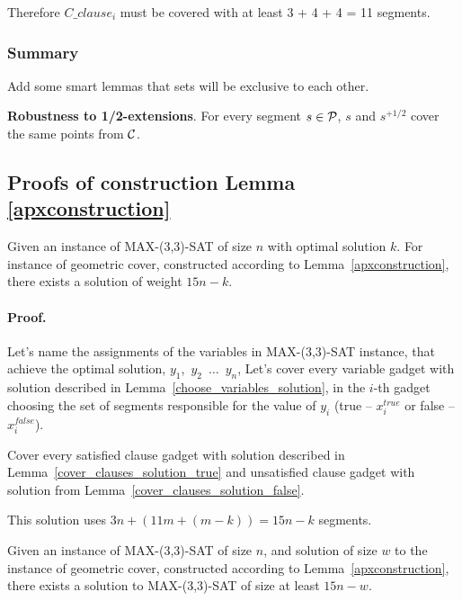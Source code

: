Therefore $C\_clause_i$ must be covered with at least 3 + 4 + 4 = 11 segments.

\subsubsection{Summary}

Add some smart lemmas that sets will be exclusive to each other.

\begin{lemma}
\textbf{Robustness to 1/2-extensions}. For every segment $s \in \mathcal{P}$,
$s$ and $s^{+1/2}$ cover the same points from $\mathcal{C}$.
\end{lemma}

\subsection{Proofs of construction Lemma \ref{apxconstruction}}
\begin{lemma}
	\label{construction_correctness}
	Given an instance of MAX-(3,3)-SAT of size $n$
	with optimal solution $k$.
	For instance of geometric cover, constructed
	according to Lemma~\ref{apxconstruction}, 
	there exists a solution of weight $15n - k$.
\end{lemma}
\paragraph{Proof.}
Let's name the assignments of the variables in MAX-(3,3)-SAT instance,
that achieve the optimal solution,
$y_1$,~$y_2$~$\ldots$~$y_n$,
Let's cover every variable gadget with solution described in
Lemma~\ref{choose_variables_solution},
in the $i$-th gadget choosing the set of segments responsible for the
value of $y_i$
(true -- $x_i^{true}$ or false -- $x_i^{false}$).

Cover every satisfied clause gadget with solution described in
Lemma~\ref{cover_clauses_solution_true}
and unsatisfied clause gadget with solution from
Lemma~\ref{cover_clauses_solution_false}.

This solution uses $3n + (11m + (m-k)) = 15n - k$ segments.

\begin{lemma}
	\label{construction_completness}
	Given an instance of MAX-(3,3)-SAT of size $n$,
	and solution of size $w$ to the instance of geometric cover,
	constructed	according to Lemma~\ref{apxconstruction},  
	there exists a solution to MAX-(3,3)-SAT of size at least $15n - w$.
\end{lemma}
